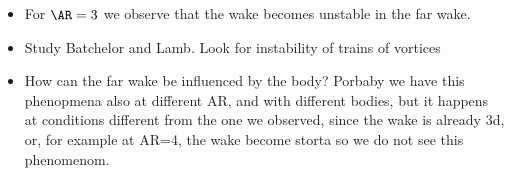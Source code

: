 \begin{itemize}
  \item For $\AR=3$ we observe that the wake becomes unstable in the far wake.
  \item Study Batchelor and Lamb. Look for instability of trains of vortices
  \item How can the far wake be influenced by the body? Porbaby we have this phenopmena also at different AR, and with different bodies, but it happens at conditions different from the one we observed, since the wake is already 3d, or, for example at AR=4, the wake become storta so we do not see this phenomenom.
\end{itemize}

\fi
